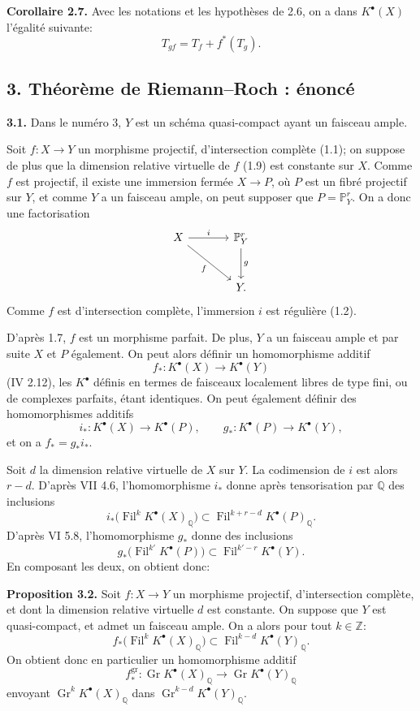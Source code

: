 \documentclass[11pt]{article}
\newcommand{\Gr}{\operatorname{Gr}}
\newcommand{\Fil}{\operatorname{Fil}}
\providecommand{\Gr}{\operatorname{Gr}}
\providecommand{\Gr}{\operatorname{G}}
\begin{document}
\textbf{Corollaire 2.7.} Avec les notations et les hypothèses de 2.6, on a dans $K^{\bullet}(X)$ l'égalité suivante:
\[
T_{gf}=T_f+f^*(T_g).
\]

\subsection*{3. Théorème de Riemann--Roch : énoncé}

\textbf{3.1.} Dans le numéro 3, $Y$ est un schéma quasi-compact ayant un faisceau ample.

Soit $f:X\to Y$ un morphisme projectif, d'intersection complète (1.1); on suppose de plus que la dimension relative virtuelle de $f$ (1.9) est constante sur $X$. Comme $f$ est projectif, il existe une immersion fermée $X\to P$, où $P$ est un fibré projectif sur $Y$, et comme $Y$ a un faisceau ample, on peut supposer que $P=\mathbb P^r_Y$. On a donc une factorisation
\[
\begin{tikzcd}[column sep=large,row sep=large]
X \arrow[r,"i"] \arrow[dr,"f"'] & \mathbb P^r_Y \arrow[d,"g"]\\
& Y.
\end{tikzcd}
\]
Comme $f$ est d'intersection complète, l'immersion $i$ est régulière (1.2).

D'après 1.7, $f$ est un morphisme parfait. De plus, $Y$ a un faisceau ample et par suite $X$ et $P$ également. On peut alors définir un homomorphisme additif
\[
f_*:K^{\bullet}(X)\longrightarrow K^{\bullet}(Y)
\]
(IV 2.12), les $K^{\bullet}$ définis en termes de faisceaux localement libres de type fini, ou de complexes parfaits, étant identiques. On peut également définir des homomorphismes additifs
\[
i_*:K^{\bullet}(X)\longrightarrow K^{\bullet}(P),
\qquad
 g_*:K^{\bullet}(P)\longrightarrow K^{\bullet}(Y),
\]
et on a $f_*=g_*i_*$.

Soit $d$ la dimension relative virtuelle de $X$ sur $Y$. La codimension de $i$ est alors $r-d$. D'après VII 4.6, l'homomorphisme $i_*$ donne après tensorisation par $\mathbb Q$ des inclusions
\[
i_*\bigl(\Fil^kK^{\bullet}(X)_{\mathbb Q}\bigr)
\subset
\Fil^{k+r-d}K^{\bullet}(P)_{\mathbb Q}.
\]
D'après VI 5.8, l'homomorphisme $g_*$ donne des inclusions
\[
g_*\bigl(\Fil^{k'}K^{\bullet}(P)\bigr)
\subset
\Fil^{k'-r}K^{\bullet}(Y).
\]
En composant les deux, on obtient donc:

\textbf{Proposition 3.2.} Soit $f:X\to Y$ un morphisme projectif, d'intersection complète, et dont la dimension relative virtuelle $d$ est constante. On suppose que $Y$ est quasi-compact, et admet un faisceau ample. On a alors pour tout $k\in\mathbb Z$:
\[
f_*\bigl(\Fil^kK^{\bullet}(X)_{\mathbb Q}\bigr)
\subset
\Fil^{k-d}K^{\bullet}(Y)_{\mathbb Q}.
\]
On obtient donc en particulier un homomorphisme additif
\[
f^{\mathrm{gr}}_*:\Gr K^{\bullet}(X)_{\mathbb Q}\longrightarrow
\Gr K^{\bullet}(Y)_{\mathbb Q}
\]
envoyant $\Gr^kK^{\bullet}(X)_{\mathbb Q}$ dans $\Gr^{k-d}K^{\bullet}(Y)_{\mathbb Q}$.
\end{document}
